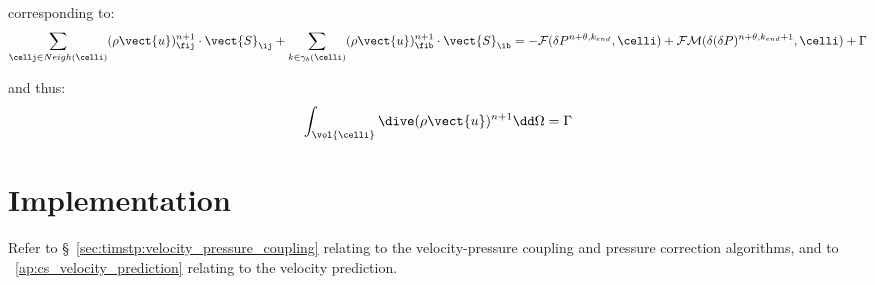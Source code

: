 \begin{remark}
corresponding to:
\begin{equation}\notag
\sum\limits_{\cellj \in Neigh(\celli)}(\rho \vect{u})^{n+1}_{\fij} \cdot \vect{S}_{\ij}
+\sum\limits_{k\in {\gamma_b(\celli)}}(\rho\vect{u})^{n+1}_{\fib} \cdot
\vect{S}_{\ib}= -\mathcal{F}(\delta
P^{n+\theta,k_{end}}, \celli)+\mathcal{FM}(\delta(\delta P)^{n+\theta,k_{end}+1},\celli) + \Gamma
\end{equation}

and thus:
\begin{equation}\notag
\int_{\vol{\celli}}{\dive(\rho \vect{u})^{n+1}  \dd \Omega} = \Gamma
\end{equation}
\end{remark}

\section*{Implementation}

Refer to \S~\ref{sec:timstp:velocity_pressure_coupling} relating to the
velocity-pressure coupling and pressure correction algorithms, and to
\appendixname~\ref{ap:cs_velocity_prediction} relating to the velocity prediction.
